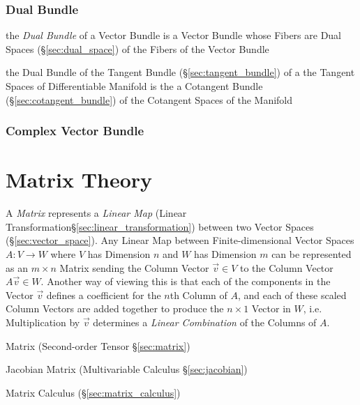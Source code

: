 \subsubsection{Dual Bundle}\label{sec:dual_vectorbundle}

the \emph{Dual Bundle} of a Vector Bundle is a Vector Bundle whose Fibers are
Dual Spaces (\S\ref{sec:dual_space}) of the Fibers of the Vector Bundle

the Dual Bundle of the Tangent Bundle (\S\ref{sec:tangent_bundle}) of a the
Tangent Spaces of Differentiable Manifold is the a Cotangent Bundle
(\S\ref{sec:cotangent_bundle}) of the Cotangent Spaces of the Manifold



\subsubsection{Complex Vector Bundle}\label{sec:complex_vector_bundle}



\section{Matrix Theory}\label{sec:matrix_theory}


A \emph{Matrix} represents a \emph{Linear Map} (Linear
Transformation\S\ref{sec:linear_transformation}) between two Vector Spaces
(\S\ref{sec:vector_space}). Any Linear Map between Finite-dimensional Vector
Spaces $A : V \rightarrow W$ where $V$ has Dimension $n$ and $W$ has Dimension
$m$ can be represented as an $m \times n$ Matrix sending the Column Vector
$\vec{v} \in V$ to the Column Vector $A\vec{v} \in W$. Another way of viewing
this is that each of the components in the Vector $\vec{v}$ defines a
coefficient for the $n$th Column of $A$, and each of these scaled Column
Vectors are added together to produce the $n \times 1$ Vector in $W$, i.e.
Multiplication by $\vec{v}$ determines a \emph{Linear Combination} of the
Columns of $A$.

\fist Matrix (Second-order Tensor \S\ref{sec:matrix})

\fist Jacobian Matrix (Multivariable Calculus \S\ref{sec:jacobian})

\fist Matrix Calculus (\S\ref{sec:matrix_calculus})

